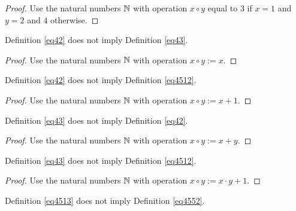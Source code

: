 \begin{proof}\leanok Use the natural numbers $\mathbb{N}$ with operation $x \circ y$ equal to $3$ if $x=1$ and $y=2$ and $4$ otherwise.
\end{proof}

\begin{theorem}\label{42_not_imply_43}\leanok{} Definition \ref{eq42} does not imply Definition \ref{eq43}.
\end{theorem}

\begin{proof}\leanok Use the natural numbers $\mathbb{N}$ with operation $x \circ y := x$.
\end{proof}

\begin{theorem}\label{42_not_imply_4512}\leanok{} Definition \ref{eq42} does not imply Definition \ref{eq4512}.
\end{theorem}

\begin{proof}\leanok Use the natural numbers $\mathbb{N}$ with operation $x \circ y := x+1$.
\end{proof}

\begin{theorem}\label{43_not_imply_42}\leanok{} Definition \ref{eq43} does not imply Definition \ref{eq42}.
\end{theorem}

\begin{proof}\leanok Use the natural numbers $\mathbb{N}$ with operation $x \circ y := x+y$.
\end{proof}

\begin{theorem}\label{43_not_imply_4512}\leanok{} Definition \ref{eq43} does not imply Definition \ref{eq4512}.
\end{theorem}

\begin{proof}\leanok Use the natural numbers $\mathbb{N}$ with operation $x \circ y := x \cdot y + 1$.
\end{proof}

\begin{theorem}\label{4513_not_imply_4552}\leanok{} Definition \ref{eq4513} does not imply Definition \ref{eq4552}.
\end{theorem}

